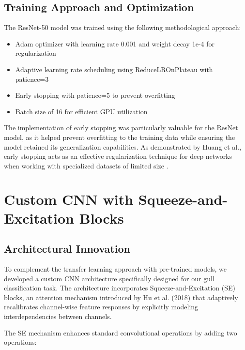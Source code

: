 \documentclass[a4paper,12pt]{article}
\begin{document}
\subsection{Training Approach and Optimization}

The ResNet-50 model was trained using the following methodological approach:

\begin{itemize}
    \item Adam optimizer with learning rate 0.001 and weight decay 1e-4 for regularization
    \item Adaptive learning rate scheduling using ReduceLROnPlateau with patience=3
    \item Early stopping with patience=5 to prevent overfitting
    \item Batch size of 16 for efficient GPU utilization
\end{itemize}

The implementation of early stopping was particularly valuable for the ResNet model, as it helped prevent overfitting to the training data while ensuring the model retained its generalization capabilities. As demonstrated by Huang et al., early stopping acts as an effective regularization technique for deep networks when working with specialized datasets of limited size \citep{huang2022early}.





\section{Custom CNN with Squeeze-and-Excitation Blocks}

\subsection{Architectural Innovation}

To complement the transfer learning approach with pre-trained models, we developed a custom CNN architecture specifically designed for our gull classification task. The architecture incorporates Squeeze-and-Excitation (SE) blocks, an attention mechanism introduced by Hu et al. (2018) that adaptively recalibrates channel-wise feature responses by explicitly modeling interdependencies between channels.

The SE mechanism enhances standard convolutional operations by adding two operations:
\end{document}

